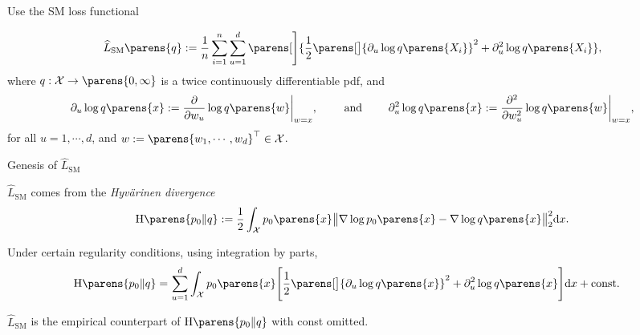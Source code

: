 \documentclass[aspectratio=169,xcolor=dvipsnames]{beamer}
\newcommand{\SM}{\mathrm{SM}}
\begin{document}
\begin{frame}{Use the SM loss functional}
	
	\begin{align}
		\widehat{L}_{\SM} \parens{q} := \frac{1}{n} \sum_{i=1}^n \sum_{u=1}^d \parens[\Bigg]{\frac{1}{2} \parens[\big]{\partial_u \log q \parens{X_i}}^2 + \partial_u^2 \log q \parens{X_i}}, 
	\end{align}
	where $q: \mathcal{X} \to \parens{0, \infty}$ is a twice continuously differentiable pdf, and 
	\begin{align*}
		\partial_u \log q \parens{x} := \frac{\partial}{\partial w_u} \log q \parens{w} \bigg\vert_{w = x}, \qquad \text{ and } \qquad \partial_u^2 \log q \parens{x} := \frac{\partial^2}{\partial w_u^2} \log q \parens{w} \bigg\vert_{w = x}, 
	\end{align*}
	for all $u = 1, \cdots, d$, and $w := \parens{w_1, \cdots, w_d}^\top \in \mathcal{X}$. 
	
\end{frame}


\begin{frame}{Genesis of $\widehat{L}_{\SM}$}

	$\widehat{L}_{\SM}$ comes from the \textit{Hyv{\"a}rinen divergence} \parencite{Hyvarinen2005-wp}
	\begin{align}
		\mathrm{H} \parens{p_0 \Vert q} := \frac{1}{2} \int_{\mathcal{X}} p_0 \parens{x} \big\Vert \nabla \log p_0 \parens{x} - \nabla \log q \parens{x} \big\Vert_2^2 \mathrm{d} x. 
	\end{align}
	
	\vspace{10pt}
	
	Under certain regularity conditions, using integration by parts, 
	\begin{align}
		\mathrm{H} \parens{p_0 \Vert q} 
		= & \, \sum_{u=1}^d \int_{\mathcal{X}} p_0 \parens{x} \Bigg[ \frac{1}{2} \parens[\big]{\partial_u \log q \parens{x}}^2 + \partial_u^2 \log q \parens{x} \Bigg] \mathrm{d} x + \text{const}. %
	\end{align}
	
	$\widehat{L}_{\SM}$ is the empirical counterpart of $\mathrm{H} \parens{p_0 \Vert q}$ with const omitted. 
	
\end{frame}
\end{document}
